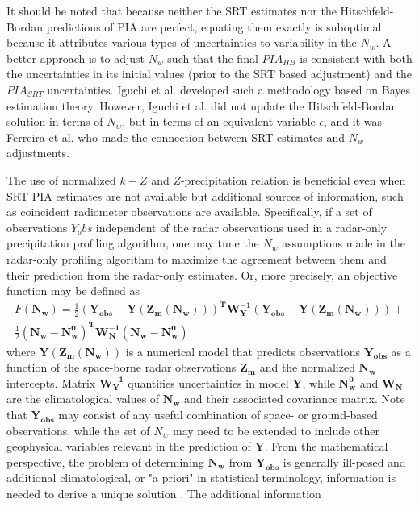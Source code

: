 \documentclass[10pt]{ietbook}
\begin{document}
It should be noted that because neither the SRT estimates nor the Hitschfeld-Bordan predictions of PIA are perfect,
equating them exactly is suboptimal because it attributes various types of uncertainties to variability in the $N_w$.
A better approach is to adjust $N_w$ such that the final $PIA_{HB}$ is consistent with both the uncertainties in its
initial values (prior to the SRT based adjustment) and the $PIA_{SRT}$ uncertainties. Iguchi et al. \cite{iguchi2000}
developed such a methodology based on Bayes estimation theory. However, Iguchi et al. \cite{iguchi2000} did not update
the Hitschfeld-Bordan solution in terms of $N_w$, but in terms of an equivalent variable $\epsilon$, and it was Ferreira
et al. \cite{ferreira2001} who made the connection between SRT estimates and $N_w$ adjustments.

The use of normalized $k-Z$ and $Z$-precipitation relation is beneficial even when SRT PIA estimates are not available
but additional sources of information, such as coincident radiometer observations are available.  Specifically, if a
set of observations $Y_obs$ independent of the radar observations used in a radar-only precipitation profiling algorithm,
one may tune the $N_w$ assumptions made in the radar-only profiling algorithm to maximize the agreement between
them and their prediction from the radar-only estimates.  Or, more precisely, an objective function may be defined as 
\begin{multline} \label{eq:fobj}
    F(\mathbf{N_w})=\frac {1}{2} \mathbf{(Y_{obs}-Y(Z_m(N_w)))^T W_Y^{-1} (Y_{obs}-Y(Z_m(N_w)))} +\\
    \frac {1} {2} \mathbf{(N_w-N_w^0)^T W_N^{-1} (N_w-N_w^0)}
\end{multline}
where $\mathbf{Y(Z_m(N_w))}$ is a numerical model that predicts observations $\mathbf{Y_{obs}}$ as a function of the space-borne
radar observations $\mathbf{Z_m}$ and the normalized $\mathbf{N_w}$ intercepts. Matrix $\mathbf{W_Y^{-1}}$ quantifies uncertainties
in model $\mathbf{Y}$, while $\mathbf{N_w^0}$ and $\mathbf{W_N}$ are the climatological values of $\mathbf{N_w}$ and their 
associated covariance matrix.
Note that $\mathbf{Y_{obs}}$ may consist of any useful combination of space- or ground-based observations, while the set of $N_w$ may
need to be extended to include other geophysical variables relevant in the prediction of $\mathbf{Y}$.  From the mathematical perspective,
the problem of determining $\mathbf{N_w}$ from $\mathbf{Y_{obs}}$ is generally ill-posed and additional climatological, or 
"a priori" in statistical terminology, information is needed to derive a unique solution \cite{tarantola2005}.  The additional information
\end{document}
